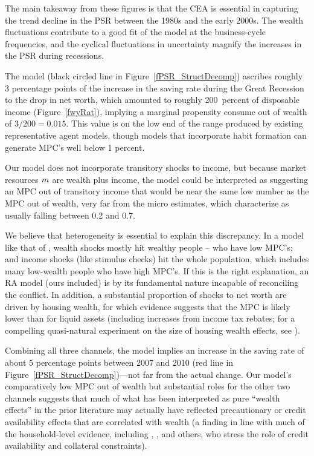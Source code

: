 \documentclass[titlepage]{\econtex}
\begin{document}
The main takeaway from these figures is that the CEA is essential in capturing the trend decline in the PSR between the 1980s and the early 2000s. The wealth fluctuations contribute to a good fit of the model at the business-cycle frequencies, and the cyclical fluctuations in uncertainty magnify the increases in the PSR during recessions.

\hypertarget{The-MPC}{}

The model (black circled line in Figure~\ref{fPSR_StructDecomp}) ascribes roughly 3 percentage points of the increase in the saving rate during the Great Recession to the drop in net worth, which amounted to roughly 200~percent of disposable income (Figure~\ref{fwyRat}), implying a marginal propensity consume out of wealth of $3/200=0.015$. This value is on the low end of the range produced by existing representative agent models, though models that incorporate habit formation can generate MPC's well below 1 percent.

Our model does not incorporate transitory shocks to income, but because market resources $m$ are wealth plus income, the model could be interpreted as suggesting an MPC out of transitory income that would be near the same low number as the MPC out of wealth, very far from the micro estimates, which \cite{cstwMPC} characterize as usually falling between 0.2 and 0.7.

We believe that heterogeneity is essential to explain this discrepancy.  In a model like that of \cite{cstwMPC}, wealth shocks mostly hit wealthy people -- who have low MPC's; and income shocks (like stimulus checks) hit the whole population, which includes many low-wealth people who have high MPC's.  If this is the right explanation, an RA model (ours included) is by its fundamental nature incapable of reconciling the conflict. In addition, a substantial proportion of shocks to net worth are driven by housing wealth, for which evidence suggests that the MPC is likely lower than for liquid assets (including increases from income tax rebates; for a compelling quasi-natural experiment on the size of housing wealth effects, see \cite{ktvHousingWealthEffect}).

Combining all three channels, the model implies an increase in the saving rate of about 5 percentage points between 2007 and 2010  (red line in Figure~\ref{fPSR_StructDecomp})---not far from the actual change.  Our model's comparatively low MPC out of wealth but substantial roles for the other two channels suggests that much of what has been interpreted as pure ``wealth effects'' in the prior literature may actually have reflected precautionary or credit availability effects that are correlated with wealth (a finding in line with much of the household-level evidence, including \cite{hurstStafford}, \cite{cooper_housingCollateral}, \cite{asWealthEffect}  and others, who stress the role of credit availability and collateral constraints).
\end{document}
